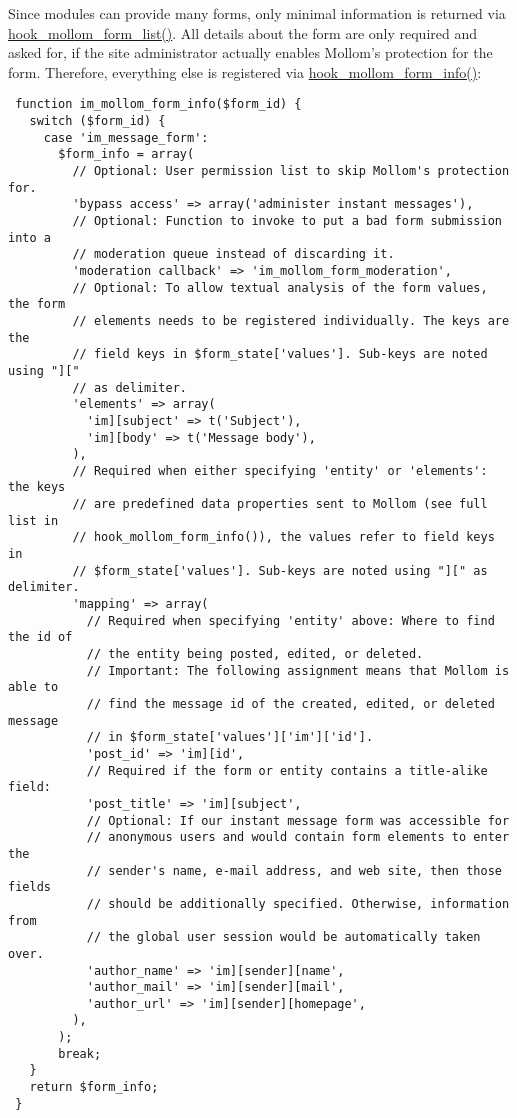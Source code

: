 Since modules can provide many forms, only minimal information is returned via \hyperlink{group__mollom__api_gdd309b0309f638d79b17a686ea96f564}{hook\_\-mollom\_\-form\_\-list()}. All details about the form are only required and asked for, if the site administrator actually enables Mollom's protection for the form. Therefore, everything else is registered via \hyperlink{group__mollom__api_ga5150fd4fabe048cbdeb41ec10908658}{hook\_\-mollom\_\-form\_\-info()}:



\begin{Code}\begin{verbatim} function im_mollom_form_info($form_id) {
   switch ($form_id) {
     case 'im_message_form':
       $form_info = array(
         // Optional: User permission list to skip Mollom's protection for.
         'bypass access' => array('administer instant messages'),
         // Optional: Function to invoke to put a bad form submission into a
         // moderation queue instead of discarding it.
         'moderation callback' => 'im_mollom_form_moderation',
         // Optional: To allow textual analysis of the form values, the form
         // elements needs to be registered individually. The keys are the
         // field keys in $form_state['values']. Sub-keys are noted using "]["
         // as delimiter.
         'elements' => array(
           'im][subject' => t('Subject'),
           'im][body' => t('Message body'),
         ),
         // Required when either specifying 'entity' or 'elements': the keys
         // are predefined data properties sent to Mollom (see full list in
         // hook_mollom_form_info()), the values refer to field keys in
         // $form_state['values']. Sub-keys are noted using "][" as delimiter.
         'mapping' => array(
           // Required when specifying 'entity' above: Where to find the id of
           // the entity being posted, edited, or deleted.
           // Important: The following assignment means that Mollom is able to
           // find the message id of the created, edited, or deleted message
           // in $form_state['values']['im']['id'].
           'post_id' => 'im][id',
           // Required if the form or entity contains a title-alike field:
           'post_title' => 'im][subject',
           // Optional: If our instant message form was accessible for
           // anonymous users and would contain form elements to enter the
           // sender's name, e-mail address, and web site, then those fields
           // should be additionally specified. Otherwise, information from
           // the global user session would be automatically taken over.
           'author_name' => 'im][sender][name',
           'author_mail' => 'im][sender][mail',
           'author_url' => 'im][sender][homepage',
         ),
       );
       break;
   }
   return $form_info;
 }
\end{verbatim}
\end{Code}



